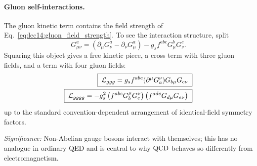 \documentclass[../main.tex]{subfiles}
\begin{document}
\paragraph{Gluon self-interactions.}
The gluon kinetic term contains the field strength of Eq.~\eqref{eq:lec14:gluon_field_strength}. To see the interaction structure, split
\begin{equation}
  G_{\mu\nu}^a =
  \left(\partial_\mu G_\nu^a-\partial_\nu G_\mu^a\right)
  -g_sf^{abc}G_\mu^bG_\nu^c .
  \label{eq:lec14:field_strength_split}
\end{equation}
Squaring this object gives a free kinetic piece, a cross term with three gluon fields, and a term with four gluon fields:
\begin{align}
  \boxed{\;\mathcal{L}_{ggg}
  = g_s f^{abc}(\partial^\mu G_a^\nu)G_{b\mu}G_{c\nu}\;}
  \label{eq:lec14:three_gluon_interaction}\\
  \boxed{\;\mathcal{L}_{gggg}
  = -g_s^2\left(f^{abc}G_b^\mu G_c^\nu\right)
       \left(f^{ade}G_{d\mu}G_{e\nu}\right)\;}
  \label{eq:lec14:four_gluon_interaction}
\end{align}
up to the standard convention-dependent arrangement of identical-field symmetry factors.

\textit{Significance:} Non-Abelian gauge bosons interact with themselves; this has no analogue in ordinary QED and is central to why $\mathrm{QCD}$ behaves so differently from electromagnetism.
\end{document}
